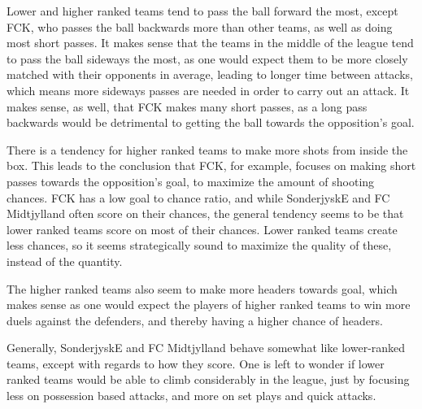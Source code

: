 \documentclass[Report.tex]{subfiles}
\begin{document}
Lower and higher ranked teams tend to pass the ball forward the most, except FCK, who passes the ball backwards more than other teams, as well as doing most short passes. It makes sense that the teams in the middle of the league tend to pass the ball sideways the most, as one would expect them to be more closely matched with their opponents in average, leading to longer time between attacks, which means more sideways passes are needed in order to carry out an attack. It makes sense, as well, that FCK makes many short passes, as a long pass backwards would be detrimental to getting the ball towards the opposition's goal. 

There is a tendency for higher ranked teams to make more shots from inside the box. This leads to the conclusion that FCK, for example, focuses on making short passes towards the opposition's goal, to maximize the amount of shooting chances. FCK has a low goal to chance ratio, and while SonderjyskE and FC Midtjylland often score on their chances, the general tendency seems to be that lower ranked teams score on most of their chances. Lower ranked teams create less chances, so it seems strategically sound to maximize the quality of these, instead of the quantity. 

The higher ranked teams also seem to make more headers towards goal, which makes sense as one would expect the players of higher ranked teams to win more duels against the defenders, and thereby having a higher chance of headers.

Generally, SonderjyskE and FC Midtjylland behave somewhat like lower-ranked teams, except with regards to how they score. One is left to wonder if lower ranked teams would be able to climb considerably in the league, just by focusing less on possession based attacks, and more on set plays and quick attacks. 	
\end{document}
